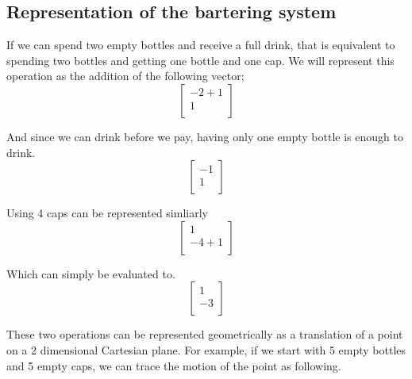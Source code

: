 \documentclass[letterpaper, 12pt]{article}
\begin{document}
\subsection{Representation of the bartering system}
\par If we can spend two empty bottles and receive a full drink, that is equivalent to spending two bottles and getting one bottle and one cap.
We will represent this operation as the addition of the following vector;
\[
    \begin{bmatrix}
       -2 + 1\\
       1\\
    \end{bmatrix}
\]
\par And since we can drink before we pay, having only one empty bottle is enough to drink.
\[
    \begin{bmatrix}
       -1\\
        1\\
    \end{bmatrix}
\]
\par Using 4 caps can be represented simliarly
\[
    \begin{bmatrix}
        1\\
        -4 + 1\\
    \end{bmatrix}
\]
\par Which can simply be evaluated to.
\[
    \begin{bmatrix}
         1\\
        -3\\
    \end{bmatrix}
\]
\par These two operations can be represented geometrically as a translation of a point on a 2 dimensional Cartesian plane.
For example, if we start with 5 empty bottles and 5 empty caps, we can trace the motion of the point as following.
\end{document}
